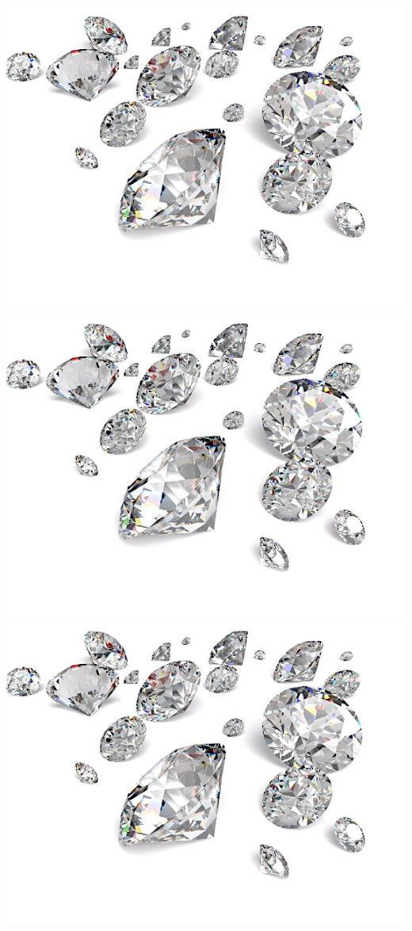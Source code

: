 \documentclass[
]{article}
\begin{document}
\includegraphics[width=0.3\linewidth]{Images/Diamond_Group}
\includegraphics[width=0.3\linewidth]{Images/Diamond_Group}
\includegraphics[width=0.3\linewidth]{Images/Diamond_Group}

\newpage
\end{document}
